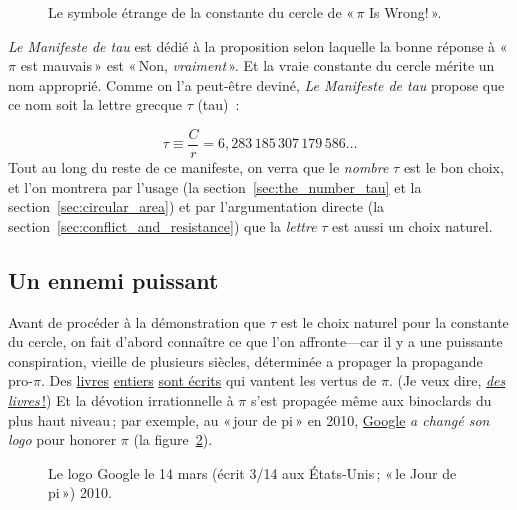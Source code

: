 \begin{figure}
\caption{Le symbole étrange de la constante du cercle de «\,$\pi$ Is Wrong!\,».\label{fig:palais_tau}}
\end{figure}

\emph{Le Manifeste de tau} est dédié à la proposition selon laquelle la bonne réponse à «\,$\pi$ est mauvais\,» est «\,Non, \emph{vraiment}\,». Et la vraie constante du cercle mérite un nom approprié. Comme on l'a peut-être deviné, \emph{Le Manifeste de tau} propose que ce nom soit la lettre grecque $\tau$ (tau)~:

\begin{equation}
\label{eq:tau}
\tau \equiv \frac{C}{r} = 6{,}283\,185\,307\,179\,586\ldots
\end{equation}
Tout au long du reste de ce manifeste, on verra que le \emph{nombre} $\tau$ est le bon choix, et l'on montrera par l'usage (la section~\ref{sec:the_number_tau} et la section~\ref{sec:circular_area}) et par l'argumentation directe (la section~\ref{sec:conflict_and_resistance}) que la \emph{lettre} $\tau$ est aussi un choix naturel.

\subsection{Un ennemi puissant} %
 \label{sec:a_powerful_enemy}
 
Avant de procéder à la démonstration que $\tau$ est le choix naturel pour la constante du cercle, on fait d'abord connaître ce que l'on affronte---car il y a une puissante conspiration, vieille de plusieurs siècles, déterminée a propager la propagande pro-$\pi$. Des \href{https://www.amazon.fr/fascinant-nombre-ESSAIS-SCIEN-ebook/dp/B07D3SYP5X/}{livres} \href{https://www.amazon.fr/1-000-000-Décimales-Nombre-Plus-Connu/dp/B085DMM9XV/}{entiers} \href{https://www.amazon.fr/Autour-du-nombre-pi-HR-ACT-SC-INDUS-ebook/dp/B081HGQSQJ/}{sont écrits} qui vantent les vertus de $\pi$. (Je veux dire, \href{https://www.amazon.com/exec/obidos/ISBN=0802713327/}{\emph{des livres}\,!}) Et la dévotion irrationnelle à $\pi$ s'est propagée même aux binoclards du plus haut niveau\,; par exemple, au «\,jour de pi\,» en 2010, \href{https://www.google.com/}{Google} \emph{a changé son logo} pour honorer $\pi$ (la figure~\ref{fig:google_pi_day.}).

\begin{figure}
\begin{center}
\end{center}
\caption{Le logo Google le 14 mars (écrit 3/14 aux États-Unis\,; «\,le Jour de pi\,») 2010.\label{fig:google_pi_day.}}
\end{figure}

